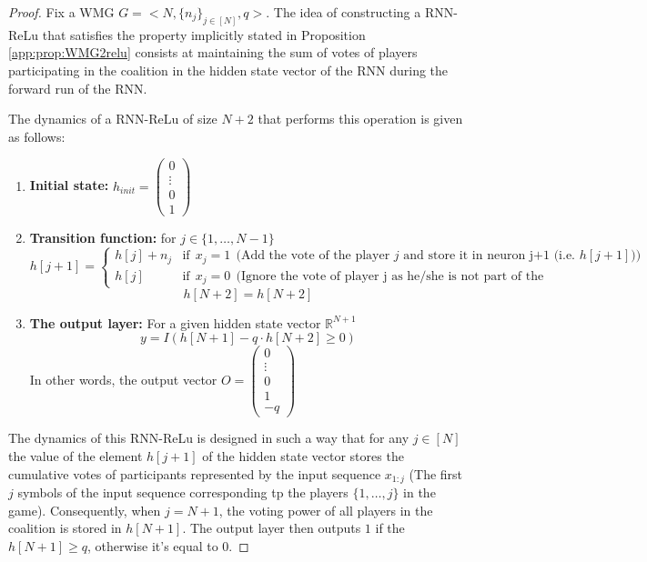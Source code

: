 \begin{proof}
   Fix a WMG $G = <N,\{n_{j}\}_{j \in [N]}, q>$. The idea of constructing a RNN-ReLu that satisfies the property implicitly stated in Proposition \ref{app:prop:WMG2relu} consists at maintaining the sum of votes of players participating in the coalition in the hidden state vector of the RNN during the forward run of the RNN.
      
    The dynamics of a RNN-ReLu of size $N+2$ that performs this operation is given as follows:
    \begin{enumerate}
        \item \textbf{Initial state:} $h_{init} = \begin{pmatrix} 0 \\ \vdots \\ 0 \\ 1 \end{pmatrix}$
        \item \textbf{Transition function:} for $j \in \{1, \ldots, N-1\}$
        $$h[j+1] = \begin{cases}
        h[j] + n_{j} & \text{if}~~ x_{j} = 1 ~~ \text{(Add the vote of the player $j$ and store it in neuron j+1 (i.e. $h[j+1]$))}\\
        h[j] & \text{if}~~x_{j} = 0 ~~\text{(Ignore the vote of player j as he/she is not part of the coalition)}
        \end{cases}
        $$ 
        $$h[N+2] = h[N+2]$$
                \item \textbf{The output layer:} For a given hidden state vector $\mathbb{R}^{N+1}$ 
        $$y = I(h[N+1] - q \cdot h[N+2] \geq 0)$$
        In other words, the output vector $O = \begin{pmatrix}
            0 \\ \vdots \\ 0 \\ 1 \\ -q
        \end{pmatrix}$
    \end{enumerate}
    The dynamics of this RNN-ReLu is designed in such a way that for any $j \in [N]$ the value of the element $h[j+1]$ of the hidden state vector stores the cumulative votes of participants represented by the input sequence $x_{1:j}$ (The first $j$ symbols of the input sequence corresponding tp the players $\{1, \ldots, j\}$ in the game). Consequently, when $j=N+1$, the voting power of all players in the coalition is stored in $h[N+1]$. The output layer then outputs $1$ if the $h[N+1] \geq q$, otherwise it's equal to $0$.
    \end{proof}

